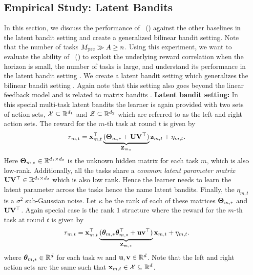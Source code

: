 \documentclass[10pt]{article}
\theoremstyle{plain}
\theoremstyle{definition}
\theoremstyle{remark}
\begin{document}
\subsection{Empirical Study: Latent Bandits}
\label{sec:latent}
In this section, we discuss the performance of \pred\ (\gt) against the other baselines in the latent bandit setting and create a generalized bilinear bandit setting.
Note that the number of tasks $M_{\text{pre}} \gg A \geq n$.
Using this experiment, we want to evaluate the ability of \pred\ (\gt) to exploit the underlying reward correlation when the horizon is small, the number of tasks is large, and understand its performance in the latent bandit setting \citep{hong2020latent, maillard2014latent, pal2023optimal, kveton2017stochastic}.
We create a latent bandit setting which generalizes the bilinear bandit setting \citep{jun2019bilinear, lu2021low, kang2022efficient, mukherjee2023multi}.
Again note that this setting also goes beyond the linear feedback model \citep{abbasi2011improved, lattimore2020bandit} and is related to matrix bandits \citep{yang2020reinforcement}.
\textbf{Latent bandit setting:} In this special multi-task latent bandits the learner is again provided with two sets of action sets, $\mathcal{X}\subseteq\mathbb{R}^{d_1}$ and $\mathcal{Z}\subseteq\mathbb{R}^{d_2}$ which are referred to as the left and right action sets.
The reward for the $m$-th task at round $t$ is given by
\begin{align*}
    r_{m,t} = \mathbf{x}_{m,t}^\top \underbrace{(\mathbf{\Theta}_{m,*} + \mathbf{U}\mathbf{V}^\top)}_{\mathbf{Z}_{m_*}}\mathbf{z}_{m,t} + \eta_{m,t}.
\end{align*}
Here  $\mathbf{\Theta}_{m,*}\in\mathbb{R}^{d_1\times d_2}$ is the unknown hidden matrix for each task $m$, which is also low-rank.
Additionally, all the tasks share a \emph{common latent parameter matrix} $\mathbf{U}\mathbf{V}^\top \in \mathbb{R}^{d_1\times d_2}$ which is also low rank. Hence the learner needs to learn the latent parameter across the tasks hence the name latent bandits.
Finally, the $\eta_{m,t}$ is a $\sigma^2$ sub-Gaussian noise. Let $\kappa$ be the rank of each of these matrices $\mathbf{\Theta}_{m, *}$ and $\mathbf{U}\mathbf{V}^\top$.
Again special case is the rank $1$ structure where the reward for the $m$-th task at round $t$ is given by
\begin{align*}
    r_{m,t} = \mathbf{x}_{m,t}^\top \underbrace{(\boldsymbol{\theta}_{m,*}\boldsymbol{\theta}_{m,*}^\top + \mathbf{u}\mathbf{v}^\top)}_{\mathbf{Z}_{m, *}}\mathbf{x}_{m,t} + \eta_{m,t}.
\end{align*}
where $\boldsymbol{\theta}_{m,*}\in\mathbb{R}^d$ for each task $m$ and $\mathbf{u}, \mathbf{v}\in\mathbb{R}^d$. Note that the left and right action sets are the same such that $\mathbf{x}_{m,t} \in \mathcal{X} \subseteq \mathbb{R}^{d}$.
\end{document}
